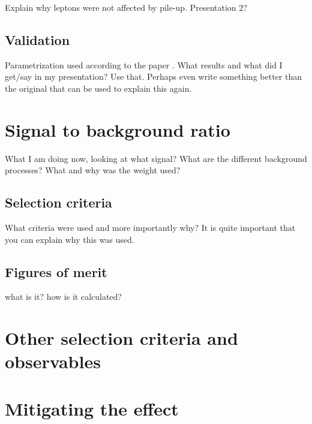 Explain why leptons were not affected by pile-up. Presentation 2?

\subsection{Validation}
Parametrization used according to the paper \citep{ATL-PHYS-PUB-2013-004}. What results and what did I get/say in my presentation? Use that. Perhaps even write something better than the original that can be used to explain this again.

\section{Signal to background ratio}
What I am doing now, looking at what signal? What are the different background processes? What and why was the weight used?
\subsection{Selection criteria}
What criteria were used and more importantly why? It is quite important that you can explain why this was used. 	
\subsection{Figures of merit}
what is it? how is it calculated?
\section{Other selection criteria and observables}
\section{Mitigating the effect}